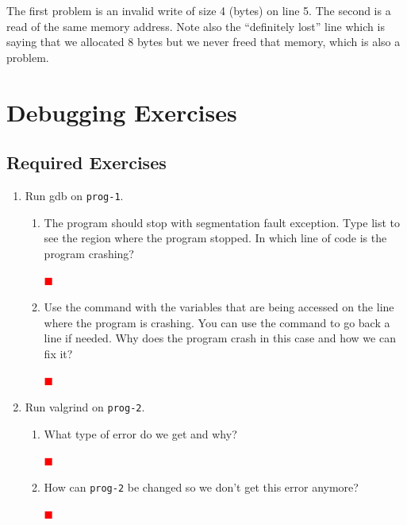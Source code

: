 \documentclass[12pt]{article}
\newcounter{problem}
\newenvironment{solution}{\par\textcolor{green!50!black}\bgroup}{\egroup\par}
\newcommand{\TODO}{\textcolor{red}{$\blacksquare$}}
\begin{document}
The first problem is an invalid write of size 4 (bytes) on line 5. The second is
a read of the same memory address. Note also the ``definitely lost'' line which
is saying that we allocated 8 bytes but we never freed that memory, which is also
a problem.

\section{Debugging Exercises}

\subsection{Required Exercises}

\begin{enumerate}
\item Run gdb on \texttt{prog-1}.
\begin{enumerate}
\item The program should stop with segmentation fault exception. Type list to
  see the region where the program stopped. In which line of code is the program
  crashing?
  \begin{solution}
  \textbf{\textcolor{red}{\TODO}}
  \end{solution}
\item Use the command  with the variables that are being
  accessed on the line where the program is crashing. You can use the 
  command to go back a line if needed. Why does the program crash in this case
  and how we can fix it?
  \begin{solution}
  \textbf{\textcolor{red}{\TODO}}
  \end{solution}
\end{enumerate}

\item Run valgrind on \texttt{prog-2}.
  \begin{enumerate}
  \item What type of error do we get and why?
    \begin{solution}
  \textbf{\textcolor{red}{\TODO}}
    \end{solution}
  \item How can \texttt{prog-2} be changed so we don't get this error anymore?
    \begin{solution}
  \textbf{\textcolor{red}{\TODO}}
    \end{solution}
  \end{enumerate}


\end{enumerate}
\end{document}
